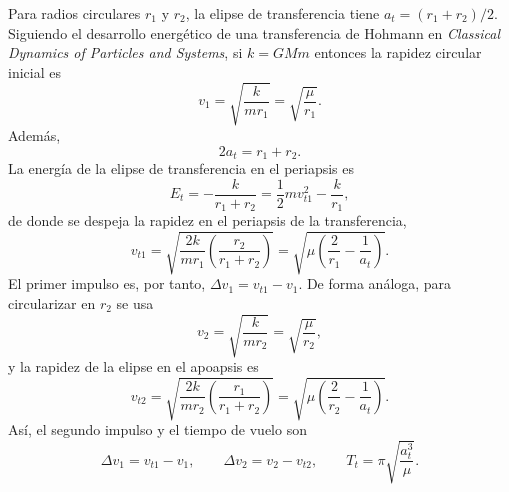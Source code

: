 \documentclass[12pt]{article}
\begin{document}
Para radios circulares $r_1$ y $r_2$, la elipse de transferencia tiene
$a_t=(r_1+r_2)/2$. Siguiendo el desarrollo energético de una transferencia de
Hohmann en \textit{Classical Dynamics of Particles and Systems}, si $k=GMm$
entonces la rapidez circular inicial es
\begin{equation}
  v_1=\sqrt{\frac{k}{m r_1}}=\sqrt{\frac{\mu}{r_1}}.
\end{equation}
Además,
\begin{equation}
  2a_t=r_1+r_2.
\end{equation}
La energía de la elipse de transferencia en el periapsis es
\begin{equation}
  E_t=-\frac{k}{r_1+r_2}
  =\frac{1}{2}m v_{t1}^2-\frac{k}{r_1},
\end{equation}
de donde se despeja la rapidez en el periapsis de la transferencia,
\begin{equation}
  v_{t1}
  =\sqrt{\frac{2k}{m r_1}\left(\frac{r_2}{r_1+r_2}\right)}
  =\sqrt{\mu\left(\frac{2}{r_1}-\frac{1}{a_t}\right)}.
\end{equation}
El primer impulso es, por tanto, $\Delta v_1=v_{t1}-v_1$.
De forma análoga, para circularizar en $r_2$ se usa
\begin{equation}
  v_2=\sqrt{\frac{k}{m r_2}}=\sqrt{\frac{\mu}{r_2}},
\end{equation}
y la rapidez de la elipse en el apoapsis es
\begin{equation}
  v_{t2}
  =\sqrt{\frac{2k}{m r_2}\left(\frac{r_1}{r_1+r_2}\right)}
  =\sqrt{\mu\left(\frac{2}{r_2}-\frac{1}{a_t}\right)}.
\end{equation}
Así, el segundo impulso y el tiempo de vuelo son
\begin{equation}
  \label{eq:hohmann}
  \Delta v_1=v_{t1}-v_1, \qquad
  \Delta v_2=v_2-v_{t2}, \qquad
  T_t=\pi\sqrt{\frac{a_t^3}{\mu}}.
\end{equation}
\end{document}
